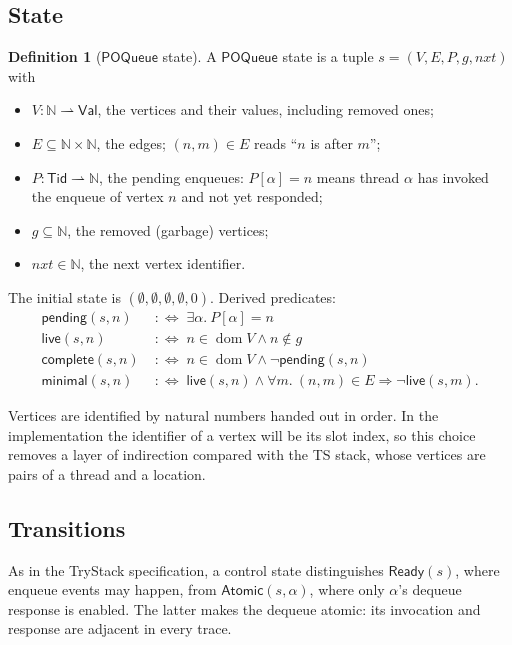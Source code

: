 \documentclass[11pt]{article}
\theoremstyle{definition}
\newtheorem{definition}[lemma]{Definition}
\theoremstyle{remark}
\newcommand{\Tid}{\mathsf{Tid}}
\newcommand{\Val}{\mathsf{Val}}
\newcommand{\dom}{\mathop{\mathrm{dom}}}
\newcommand{\Ready}{\mathsf{Ready}}
\newcommand{\Atomic}{\mathsf{Atomic}}
\newcommand{\live}{\mathsf{live}}
\newcommand{\pending}{\mathsf{pending}}
\newcommand{\complete}{\mathsf{complete}}
\newcommand{\minimal}{\mathsf{minimal}}
\newcommand{\POQueue}{\mathsf{POQueue}}
\begin{document}
\subsection{State}

\begin{definition}[$\POQueue$ state]
A $\POQueue$ state is a tuple $s = (V, E, P, g, \mathit{nxt})$ with
\begin{itemize}[nosep]
\item $V : \mathbb{N} \rightharpoonup \Val$, the vertices and their values,
  including removed ones;
\item $E \subseteq \mathbb{N} \times \mathbb{N}$, the edges; $(n, m) \in E$
  reads ``$n$ is after $m$'';
\item $P : \Tid \rightharpoonup \mathbb{N}$, the pending enqueues: $P[\alpha]
  = n$ means thread $\alpha$ has invoked the enqueue of vertex $n$ and not
  yet responded;
\item $g \subseteq \mathbb{N}$, the removed (garbage) vertices;
\item $\mathit{nxt} \in \mathbb{N}$, the next vertex identifier.
\end{itemize}
The initial state is $(\emptyset, \emptyset, \emptyset, \emptyset, 0)$.
Derived predicates:
\begin{align*}
\pending(s, n) &\;:\Leftrightarrow\; \exists \alpha.\ P[\alpha] = n \\
\live(s, n) &\;:\Leftrightarrow\; n \in \dom V \wedge n \notin g \\
\complete(s, n) &\;:\Leftrightarrow\; n \in \dom V \wedge \neg\pending(s, n) \\
\minimal(s, n) &\;:\Leftrightarrow\; \live(s, n) \wedge
  \forall m.\ (n, m) \in E \Rightarrow \neg\live(s, m).
\end{align*}
\end{definition}

Vertices are identified by natural numbers handed out in order.  In the
implementation the identifier of a vertex will be its slot index, so this
choice removes a layer of indirection compared with the TS stack, whose
vertices are pairs of a thread and a location.

\subsection{Transitions}

As in the TryStack specification, a control state distinguishes
$\Ready(s)$, where enqueue events may happen, from $\Atomic(s, \alpha)$,
where only $\alpha$'s dequeue response is enabled.  The latter makes the
dequeue atomic: its invocation and response are adjacent in every trace.
\end{document}
